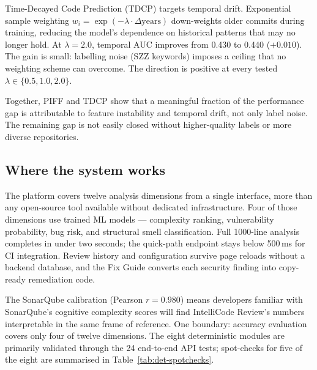 \documentclass[12pt, oneside]{report}
\begin{document}
Time-Decayed Code Prediction (TDCP) targets temporal drift. Exponential sample weighting $w_i = \exp(-\lambda \cdot \Delta\text{years})$ down-weights older commits during training, reducing the model's dependence on historical patterns that may no longer hold. At $\lambda = 2.0$, temporal AUC improves from 0.430 to 0.440 ($+0.010$). The gain is small: labelling noise (SZZ keywords) imposes a ceiling that no weighting scheme can overcome. The direction is positive at every tested $\lambda \in \{0.5, 1.0, 2.0\}$.

Together, PIFF and TDCP show that a meaningful fraction of the performance gap is attributable to feature instability and temporal drift, not only label noise. The remaining gap is not easily closed without higher-quality labels or more diverse repositories.

\subsection{Where the system works}

The platform covers twelve analysis dimensions from a single interface, more than any
open-source tool available without dedicated infrastructure. Four of those dimensions
use trained ML models — complexity ranking, vulnerability probability, bug risk, and
structural smell classification. Full 1000-line analysis completes in under two seconds;
the quick-path endpoint stays below 500\,ms for CI integration. Review history and
configuration survive page reloads without a backend database, and the Fix Guide
converts each security finding into copy-ready remediation code.

The SonarQube calibration (Pearson $r = 0.980$) means developers familiar with SonarQube's cognitive complexity scores will find IntelliCode Review's numbers interpretable in the same frame of reference. One boundary: accuracy evaluation covers only four of twelve dimensions. The eight deterministic modules are primarily validated through the 24 end-to-end API tests; spot-checks for five of the eight are summarised in Table~\ref{tab:det-spotchecks}.
\end{document}
